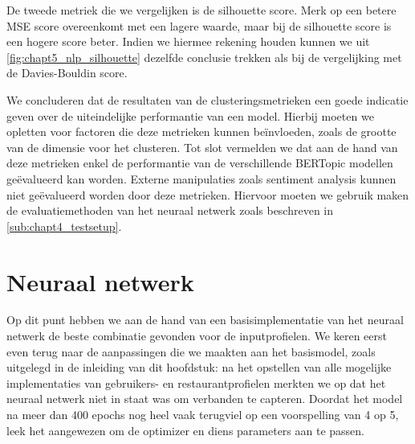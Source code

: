 
De tweede metriek die we vergelijken is de silhouette score. Merk op een betere MSE score overeenkomt met een lagere waarde, maar bij de silhouette score is een hogere score beter. Indien we hiermee rekening houden kunnen we uit \autoref{fig:chapt5_nlp_silhouette} dezelfde conclusie trekken als bij de vergelijking met de Davies-Bouldin score.

We concluderen dat de resultaten van de clusteringsmetrieken een goede indicatie geven over de uiteindelijke performantie van een model. Hierbij moeten we opletten voor factoren die deze metrieken kunnen beïnvloeden, zoals de grootte van de dimensie voor het clusteren. Tot slot vermelden we dat aan de hand van deze metrieken enkel de performantie van de verschillende BERTopic modellen geëvalueerd kan worden. Externe manipulaties zoals sentiment analysis kunnen niet geëvalueerd worden door deze metrieken. Hiervoor moeten we gebruik maken de evaluatiemethoden van het neuraal netwerk zoals beschreven in \autoref{sub:chapt4_testsetup}.

























\section{Neuraal netwerk}
\label{sec:chapt5_neuraal_netwerk}
Op dit punt hebben we aan de hand van een basisimplementatie van het neuraal netwerk de beste combinatie gevonden voor de inputprofielen. We keren eerst even terug naar de aanpassingen die we maakten aan het basismodel, zoals uitgelegd in de inleiding van dit hoofdstuk: na het opstellen van alle mogelijke implementaties van gebruikers- en restaurantprofielen merkten we op dat het neuraal netwerk niet in staat was om verbanden te capteren. Doordat het model na meer dan 400 epochs nog heel vaak terugviel op een voorspelling van 4 op 5, leek het aangewezen om de optimizer en diens parameters aan te passen.

